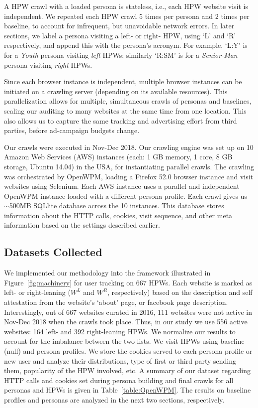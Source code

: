 \documentclass{article}
\newcommand{\hpw}{HPW\xspace}
\newcommand{\hpws}{HPWs\xspace}
\begin{document}
A \hpw crawl with a loaded persona is stateless, i.e., each \hpw website visit is independent.
We repeated each \hpw crawl 5 times per persona and 2 times per baseline, to account for infrequent, but unavoidable network errors.
In later sections, we label a persona visiting a left- or right- \hpw, using `L' and `R' respectively, and append this with the persona's acronym.
For example, `L:Y' is for a \emph{Youth} persona visiting \emph{left} \hpws; similarly `R:SM' is for a \emph{Senior-Man} persona visiting \emph{right} \hpws.

Since each browser instance is independent, multiple browser instances can be initiated on a crawling server (depending on its available resources).
This parallelization allows for multiple, simultaneous crawls of personas and baselines, scaling our auditing to many websites at the same time from one location.
This also allows us to capture the same tracking and advertising effort from third parties, before ad-campaign budgets change.

Our crawls were executed in Nov-Dec 2018.
Our crawling engine was set up on 10 Amazon Web Services (AWS) instances (each: 1 GB memory, 1 core, 8 GB storage, Ubuntu 14.04) in the USA, for instantiating parallel crawls.
The crawling was orchestrated by OpenWPM, loading a Firefox 52.0 browser instance and visit websites using Selenium.
Each AWS instance uses a parallel and independent OpenWPM instance loaded with a different persona profile.
Each crawl gives us $\sim$500MB SQLlite database across the 10 instances.
This database stores information about the HTTP calls, cookies, visit sequence, and other meta information based on the settings described earlier.

\subsection{Datasets Collected}\label{sec:hpw}

We implemented our methodology into the framework illustrated in Figure~\ref{fig:machinery} for user tracking on 667 \hpws.
Each website is marked as left- or right-leaning ($W^L$ and $W^R$, respectively) based on the description and self attestation from the website's `about' page, or facebook page description.
Interestingly, out of 667 websites curated in 2016, 111 websites were not active in Nov-Dec 2018 when the crawls took place.
Thus, in our study we use 556 active websites: 164 left- and 392 right-leaning \hpws.
We normalize our results to account for the imbalance between the two lists.
We visit \hpws using baseline (null) and persona profiles.
We store the cookies served to each persona profile or new user and analyze their distributions, type of first or third party sending them, popularity of the \hpw involved, etc.
A summary of our dataset regarding HTTP calls and cookies set during persona building and final crawls for all personas and \hpws is given in Table~\ref{table:OpenWPM}.
The results on baseline profiles and personas are analyzed in the next two sections, respectively.
\end{document}
